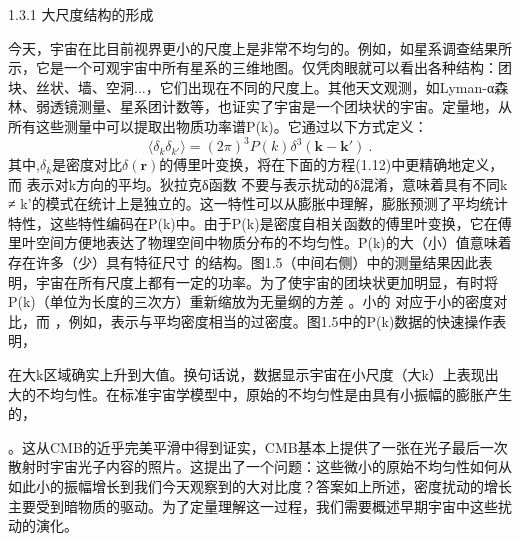 

1.3.1 大尺度结构的形成

今天，宇宙在比目前视界更小的尺度上是非常不均匀的。例如，如星系调查结果所示，它是一个可观宇宙中所有星系的三维地图。仅凭肉眼就可以看出各种结构：团块、丝状、墙、空洞...，它们出现在不同的尺度上。其他天文观测，如Lyman-α森林、弱透镜测量、星系团计数等，也证实了宇宙是一个团块状的宇宙。定量地，从所有这些测量中可以提取出物质功率谱P(k)。它通过以下方式定义：
\begin{equation}
\langle \delta_k \delta_{k'} \rangle = (2\pi)^3 P(k) \delta^3(\mathbf k - \mathbf k')~.
\end{equation}
其中,$\delta_k$是密度对比$\delta(\mathbf r)$的傅里叶变换，将在下面的方程(1.12)中更精确地定义，而 
 表示对k方向的平均。狄拉克δ函数 
 不要与表示扰动的δ混淆，意味着具有不同k ≠ k'的模式在统计上是独立的。这一特性可以从膨胀中理解，膨胀预测了平均统计特性，这些特性编码在P(k)中。由于P(k)是密度自相关函数的傅里叶变换，它在傅里叶空间方便地表达了物理空间中物质分布的不均匀性。P(k)的大（小）值意味着存在许多（少）具有特征尺寸 
 的结构。图1.5（中间右侧）中的测量结果因此表明，宇宙在所有尺度上都有一定的功率。为了使宇宙的团块状更加明显，有时将P(k)（单位为长度的三次方）重新缩放为无量纲的方差 
 。小的
 对应于小的密度对比，而 
 ，例如，表示与平均密度相当的过密度。图1.5中的P(k)数据的快速操作表明，
 
  在大k区域确实上升到大值。换句话说，数据显示宇宙在小尺度（大k）上表现出大的不均匀性。在标准宇宙学模型中，原始的不均匀性是由具有小振幅的膨胀产生的，
 
 。这从CMB的近乎完美平滑中得到证实，CMB基本上提供了一张在光子最后一次散射时宇宙光子内容的照片。这提出了一个问题：这些微小的原始不均匀性如何从如此小的振幅增长到我们今天观察到的大对比度？答案如上所述，密度扰动的增长主要受到暗物质的驱动。为了定量理解这一过程，我们需要概述早期宇宙中这些扰动的演化。